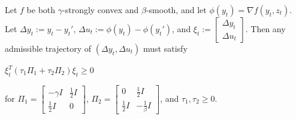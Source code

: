 \documentclass[twoside,11pt]{article}
\begin{document}
\begin{theorem}
Let $f$ be both $\gamma$-strongly convex and $\beta$-smooth, and let $\phi(y_t) = \nabla f (y_t,z_t)$. Let $\Delta y_t := y_t-y_t'$, $\Delta u_t := \phi(y_t)-\phi(y_t')$, and $\xi_t := \begin{bmatrix}
    \Delta y_t \\
    \Delta u_t
\end{bmatrix}$. Then any admissible trajectory of $(\Delta y_t, \Delta u_t)$ must satisfy

\begin{center}
$\xi_t^T(\tau_1\Pi_1 + \tau_2\Pi_2)\xi_t \geq 0$
\end{center}

\noindent
for $\Pi_1 = \begin{bmatrix}
    -\gamma I & \frac{1}{2}I \\
    \frac{1}{2}I & 0
\end{bmatrix}$, $\Pi_2 = \begin{bmatrix}
    0 & \frac{1}{2}I \\
    \frac{1}{2}I & -\frac{1}{\beta}I
\end{bmatrix}$, and $\tau_1, \tau_2 \geq 0$.
\end{theorem}
\end{document}
